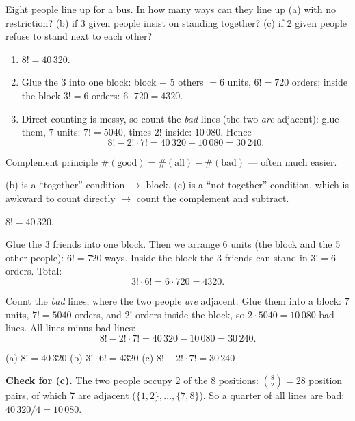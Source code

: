 
\begin{problem}
	Eight people line up for a bus. In how many ways can they line up (a) with
	no restriction? (b) if 3 given people insist on standing together? (c) if 2
	given people refuse to stand next to each other?
\end{problem}

\begin{slides}
	\small
	\exstatement
	\pause
	\sol
	\begin{enumerate}\setlength{\itemsep}{0pt}
		\item[(a)] $8! = 40\,320$.
		\item[(b)] Glue the 3 into one block: block $+$ 5 others $=6$ units,
		      $6!=720$ orders; inside the block $3!=6$ orders:
		      $6\cdot 720 = 4320$.
		\item[(c)] Direct counting is messy, so count the \emph{bad} lines
		      (the two \emph{are} adjacent): glue them, $7$ units: $7!=5040$,
		      times $2!$ inside: $10\,080$. Hence
		      \[ 8! - 2!\cdot 7! = 40\,320-10\,080 = 30\,240. \]
	\end{enumerate}
	\begin{alertblock}{Complement principle}
		$\#(\text{good}) = \#(\text{all}) - \#(\text{bad})$ --- often much easier.
	\end{alertblock}
\end{slides}

\begin{solution}
	\idea (b) is a ``together'' condition $\to$ block. (c) is a ``not
	together'' condition, which is awkward to count directly $\to$ count the
	complement and subtract.

	 $8! = 40\,320$.

	 Glue the 3 friends into one block. Then we arrange 6 units (the
	block and the 5 other people): $6!=720$ ways. Inside the block the 3 friends
	can stand in $3!=6$ orders. Total:
	\[ 3!\cdot6! = 6\cdot720 = 4320. \]

	 Count the \emph{bad} lines, where the two people \emph{are}
	adjacent. Glue them into a block: $7$ units, $7!=5040$ orders, and $2!$
	orders inside the block, so $2\cdot5040=10\,080$ bad lines. All lines minus
	bad lines:
	\[ 8!-2!\cdot7! = 40\,320-10\,080 = 30\,240. \]

	\begin{answer}
		(a) $8!=40\,320$ \quad (b) $3!\cdot6!=4320$ \quad
		(c) $8!-2!\cdot7!=30\,240$
	\end{answer}

	\begin{remark}
		\textbf{Check for (c).} The two people occupy 2 of the 8 positions:
		$\binom82=28$ position pairs, of which 7 are adjacent ($\{1,2\},\dots,
			\{7,8\}$). So a quarter of all lines are bad: $40\,320/4=10\,080$.
	\end{remark}
\end{solution}
